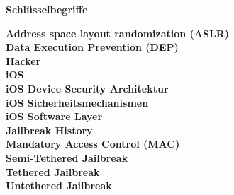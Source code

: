 %
%
% 
% 
% 

\begin{center}
{\Large\bfseries Schlüsselbegriffe}
\end{center}

\noindent
\textbf{Address space layout randomization (ASLR)} \\
\textbf{Data Execution Prevention (DEP)} \\
\textbf{Hacker} \\
\textbf{iOS} \\
\textbf{iOS Device Security Architektur} \\
\textbf{iOS Sicherheitsmechanismen} \\
\textbf{iOS Software Layer} \\
\textbf{Jailbreak History} \\
\textbf{Mandatory Access Control (MAC)} \\
\textbf{Semi-Tethered Jailbreak} \\
\textbf{Tethered Jailbreak } \\
\textbf{Untethered Jailbreak } \\



